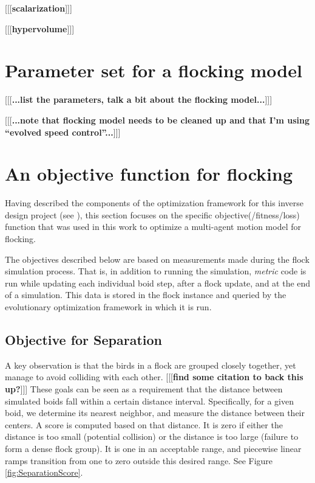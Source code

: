 \documentclass[letterpaper]{article}
\begin{document}
[[[\textbf{scalarization}]]]

[[[\textbf{hypervolume}]]]

\section{Parameter set for a flocking model}
\label{sec:parameter_set}

[[[\textbf{...list the parameters, talk a bit about the flocking model...}]]]

[[[\textbf{...note that flocking model needs to be cleaned up and that I'm using ``evolved speed control''...}]]]

\section{An objective function for flocking}
\label{sec:FlockingObjective}

Having described the components of the optimization framework for this inverse design project (see ), this section focuses on the specific objective(/fitness/loss) function that was used in this work to optimize a multi-agent motion model for flocking.

The objectives described below are based on measurements made during the flock simulation process. That is, in addition to running the simulation, \textit{metric} code is run while updating each individual boid step, after a flock update, and at the end of a simulation. This data is stored in the flock instance and queried by the evolutionary optimization framework in which it is run.

\subsection{Objective for Separation}
\label{subsec:separation_objective}

A key observation is that the birds in a flock are grouped closely together, yet manage to avoid colliding with each other. [[[\textbf{find some citation to back this up?}]]] These goals can be seen as a requirement that the distance between simulated boids fall within a certain distance interval. Specifically, for a given boid, we determine its nearest neighbor, and measure the distance between their centers. A score is computed based on that distance. It is zero if either the distance is too small (potential collision) or the distance is too large (failure to form a dense flock group). It is one in an acceptable range, and piecewise linear ramps transition from one to zero outside this desired range. See Figure \ref{fig:SeparationScore}.
\end{document}
